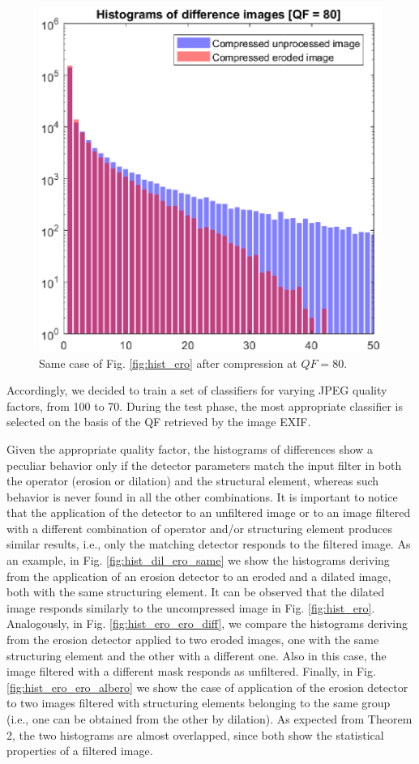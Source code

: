 \documentclass[review]{elsarticle}
\begin{document}
\begin{figure}[!h]%
	\centering
	\includegraphics[scale=0.55]{hist_ero_80.eps}
	\caption{Same case of Fig. \ref{fig:hist_ero} after compression at $QF = 80$.}
	\label{fig:hist_ero_80}%
\end{figure}

Accordingly, we decided to train a set of classifiers for varying JPEG quality factors, from 100 to 70. During the test phase, the most appropriate classifier is selected on the basis of the QF retrieved by the image EXIF.

Given the appropriate quality factor, the histograms of differences show a peculiar behavior only if the detector parameters match the input filter in both the operator (erosion or dilation) and the structural element, whereas such behavior is never found in all the other combinations. It is important to notice that the application of the detector to an unfiltered image or to an image filtered with a different combination of operator and/or structuring element produces similar results, i.e., only the matching detector responds to the filtered image. As an example, in Fig. \ref{fig:hist_dil_ero_same} we show the histograms deriving from the application of an erosion detector to an eroded and a dilated image, both with the same structuring element. It can be observed that the dilated image responds similarly to the uncompressed image in Fig. \ref{fig:hist_ero}. Analogously, in Fig. \ref{fig:hist_ero_ero_diff}, we compare the histograms deriving from the erosion detector applied to two eroded images, one with the same structuring element and the other with a different one. Also in this case, the image filtered with a different mask responds as unfiltered. Finally, in Fig. \ref{fig:hist_ero_ero_albero} we show the case of application of the erosion detector to two images filtered with structuring elements belonging to the same group (i.e., one can be obtained from the other by dilation). As expected from Theorem 2, the two histograms are almost overlapped, since both show the statistical properties of a filtered image.
\end{document}
